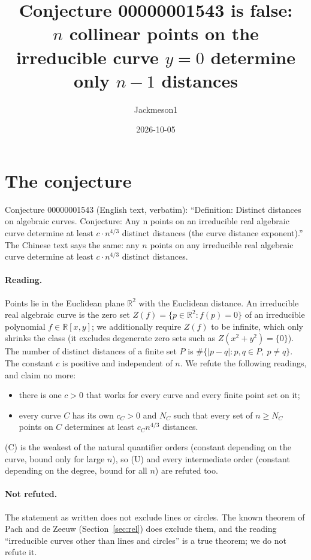 \documentclass[11pt]{article}
\title{Conjecture 00000001543 is false:\\ $n$ collinear points on the irreducible curve $y=0$ determine only $n-1$ distances}
\author{Jackmeson1}
\date{2026-10-05}
\theoremstyle{definition}
\begin{document}
\maketitle

\section{The conjecture}
Conjecture 00000001543 (English text, verbatim): ``Definition: Distinct distances on algebraic
curves. Conjecture: Any n points on an irreducible real algebraic curve determine at least
$c\cdot n^{4/3}$ distinct distances (the curve distance exponent).'' The Chinese text says the
same: any $n$ points on any irreducible real algebraic curve determine at least $c\cdot n^{4/3}$
distinct distances.

\paragraph{Reading.} Points lie in the Euclidean plane $\mathbb R^2$ with the Euclidean distance.
An irreducible real algebraic curve is the zero set $Z(f)=\{p\in\mathbb R^2: f(p)=0\}$ of an
irreducible polynomial $f\in\mathbb R[x,y]$; we additionally require $Z(f)$ to be infinite, which
only shrinks the class (it excludes degenerate zero sets such as $Z(x^2+y^2)=\{0\}$). The number
of distinct distances of a finite set $P$ is $\#\{|p-q| : p,q\in P,\ p\neq q\}$. The constant $c$
is positive and independent of $n$. We refute the following readings, and claim no more:
\begin{itemize}
\item[(U)] there is one $c>0$ that works for every curve and every finite point set on it;
\item[(C)] every curve $C$ has its own $c_C>0$ and $N_C$ such that every set of $n\ge N_C$
points on $C$ determines at least $c_C n^{4/3}$ distances.
\end{itemize}
(C) is the weakest of the natural quantifier orders (constant depending on the curve, bound only
for large $n$), so (U) and every intermediate order (constant depending on the degree, bound for
all $n$) are refuted too.

\paragraph{Not refuted.} The statement as written does not exclude lines or circles. The known
theorem of Pach and de Zeeuw (Section~\ref{sec:rel}) does exclude them, and the reading
``irreducible curves other than lines and circles'' is a true theorem; we do not refute it.
\end{document}
